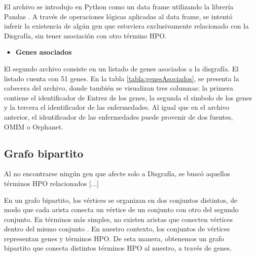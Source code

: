 El archivo se introdujo en Python como un data frame utilizando la librería Pandas \cite{pandasPython}. A través de operaciones lógicas aplicadas al data frame, se intentó inferir la existencia de algún gen que estuviera exclusivamente relacionado con la Disgrafía, sin tener asociación con otro término HPO.

\begin{itemize}
	\item \textbf{Genes asociados}
\end{itemize}

El segundo archivo consiste en un listado de genes asociados a la disgrafía. El listado cuenta con 51 genes. En la tabla \ref{tabla:genesAsociados}, se presenta la cabecera del archivo, donde también se visualizan tres columnas: la primera contiene el identificador de Entrez de los genes, la segunda el símbolo de los genes y la tercera el identificador de las enfermedades. Al igual que en el archivo anterior, el identificador de las enfermedades puede provenir de dos fuentes, OMIM o Orphanet.

\begin{table}[h]
	\centering
	\caption{Cabecera del archivo de genes asociados}
	\label{tabla:genesAsociados}    
\end{table}


\subsection{Grafo bipartito}

Al no encontrarse ningún gen que afecte solo a Disgrafía, se buscó aquellos términos HPO relacionados [...]

En un grafo bipartito, los vértices se organizan en dos conjuntos distintos, de modo que cada arista conecta un vértice de un conjunto con otro del segundo conjunto. En términos más simples, no existen aristas que conecten vértices dentro del mismo conjunto \cite{BiRank2017}. En nuestro contexto, los conjuntos de vértices representan genes y términos HPO. De esta manera, obtenemos un grafo bipartito que conecta distintos términos HPO al nuestro, a través de genes. 

